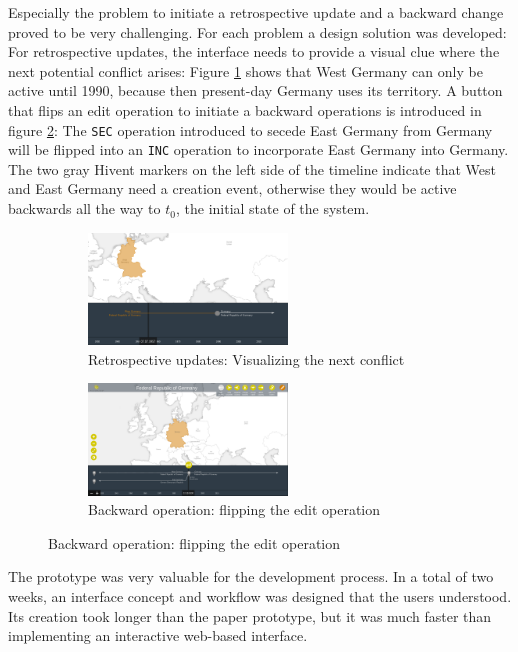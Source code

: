 Especially the problem to initiate a retrospective update and a backward change proved to be very challenging. For each problem a design solution was developed: For retrospective updates, the interface needs to provide a visual clue where the next potential conflict arises: Figure \ref{sfig:retrospective_update} shows that West Germany can only be active until 1990, because then present-day Germany uses its territory. A button that flips an edit operation to initiate a backward operations is introduced in figure \ref{sfig:backward_change}: The \texttt{SEC} operation introduced to secede East Germany from Germany will be flipped into an \texttt{INC} operation to incorporate East Germany into Germany. The two gray Hivent markers on the left side of the timeline indicate that West and East Germany need a creation event, otherwise they would be active backwards all the way to $t_0$, the initial state of the system.

\begin{figure}[ht]
\centering
\begin{subfigure}[b]{.5\textwidth}
  \centering
  \includegraphics[width=200px]{graphics/development/user_interface_design_process/retrospective_update.png}
  \caption{Retrospective updates: Visualizing the next conflict}
  \label{sfig:retrospective_update}
\end{subfigure}%
\begin{subfigure}[b]{.5\textwidth}
  \centering
  \includegraphics[width=200px]{graphics/development/user_interface_design_process/backward_change.png}
  \caption{Backward operation: flipping the edit operation}
  \label{sfig:backward_change}
\end{subfigure}
\label{fig:backward_change}
\end{figure}

The prototype was very valuable for the development process. In a total of two weeks, an interface concept and workflow was designed that the users understood. Its creation took longer than the paper prototype, but it was much faster than implementing an interactive web-based interface.


